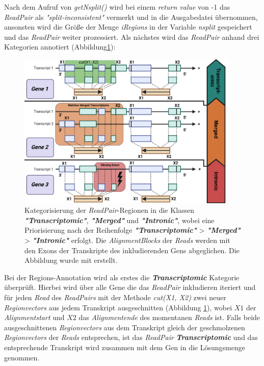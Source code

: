 \documentclass[12pt]{article}
\begin{document}
Nach dem Aufruf von \textit{getNsplit()} wird bei einem \textit{return value} von -1 das \textit{ReadPair} als 
\textit{"split-inconsistent"} vermerkt und in die Ausgabedatei übernommen, ansonsten wird die Grö\ss e der
Menge \textit{iRegions} in der Variable \textit{nsplit} gespeichert und das \textit{ReadPair} weiter prozessiert.
\newpage
Als nächstes wird das \textit{ReadPair} anhand drei Kategorien annotiert (Abbildung\ref{fig:-figures-ReadAnnotation-png}):
\begin{figure}[htpb]
    \centering
    \includegraphics[width=0.95\textwidth]{./figures/ReadAnnotation.png}
\caption{Kategorisierung der \textit{ReadPair}-Regionen in die Klassen \textit{\textbf{"Transcriptomic"}},
\textit{\textbf{"Merged"}} und \textit{\textbf{"Intronic"}}, wobei eine Priorisierung nach 
der Reihenfolge \textit{\textbf{"Transcriptomic"}} > \textit{\textbf{"Merged"}} > \textit{\textbf{"Intronic"}} erfolgt.
Die \textit{AlignmentBlocks} der \textit{Reads} werden mit den Exons der Transkripte des inkludierenden Gens abgeglichen. 
Die Abbildung wurde mit \cite{biorender} erstellt.}
    \label{fig:-figures-ReadAnnotation-png}
\end{figure}

Bei der Regions-Annotation wird als erstes die \textit{\textbf{Transcriptomic}} Kategorie überprüft.
Hierbei wird über alle Gene die das \textit{ReadPair} inkludieren iteriert und für jeden \textit{Read} des \textit{ReadPairs} mit der Methode
\textit{cut(X1, X2)} zwei neuer \textit{Regionvectors} aus jedem Transkript  ausgeschnitten (Abbildung \ref{fig:-figures-ReadAnnotation-png}), 
wobei $X1$ der \textit{Alignmentstart} und $X2$ das \textit{Alignmentende} des momentanen \textit{Reads} ist.
Falls beide ausgeschnittenen \textit{Regionvectors} aus dem Transkript gleich der geschmolzenen \textit{Regionvectors} der 
\textit{Reads} entsprechen, ist das \textit{ReadPair} \textit{\textbf{Transcriptomic}} und das entsprechende Transkript
wird zusammen mit dem Gen in die Lösungsmenge genommen. 
\end{document}

